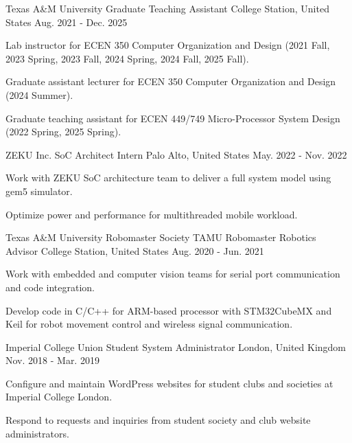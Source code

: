 
\begin{cventries}
    
    \cventry
    {Texas A\&M University} %
    {Graduate Teaching Assistant} %
    {College Station, United States} %
    {Aug. 2021 - Dec. 2025} %
    {
      \begin{cvitems} %
        \item {Lab instructor for ECEN 350 Computer Organization and Design (2021 Fall, 2023 Spring, 2023 Fall, 2024 Spring, 2024 Fall, 2025 Fall).}
        \item {Graduate assistant lecturer for ECEN 350 Computer Organization and Design (2024 Summer).}
        \item {Graduate teaching assistant for ECEN 449/749 Micro-Processor System Design (2022 Spring, 2025 Spring).}
      \end{cvitems}
    }
    
    \cventry
    {ZEKU Inc.} %
    {SoC Architect Intern} %
    {Palo Alto, United States} %
    {May. 2022 - Nov. 2022} %
    {
      \begin{cvitems} %
        \item {Work with ZEKU SoC architecture team to deliver a full system model using gem5 simulator.}
        \item {Optimize power and performance for multithreaded mobile workload.}        
      \end{cvitems}
    }
    
  \cventry
    {Texas A\&M University Robomaster Society} %
    {TAMU Robomaster Robotics Advisor} %
    {College Station, United States} %
    {Aug. 2020 - Jun. 2021} %
    {
      \begin{cvitems} %
        \item {Work with embedded and computer vision teams for serial port communication and code integration.}
        \item {Develop code in C/C++ for ARM-based processor with STM32CubeMX and Keil for robot movement control and wireless signal communication.}
      \end{cvitems}
    }

  \cventry
    {Imperial College Union} %
    {Student System Administrator} %
    {London, United Kingdom} %
    {Nov. 2018 - Mar. 2019} %
    {
      \begin{cvitems} %
        \item {Configure and maintain WordPress websites for student clubs and societies at Imperial College London.}
        \item {Respond to requests and inquiries from student society and club website administrators.}
      \end{cvitems}
    }


\end{cventries}
